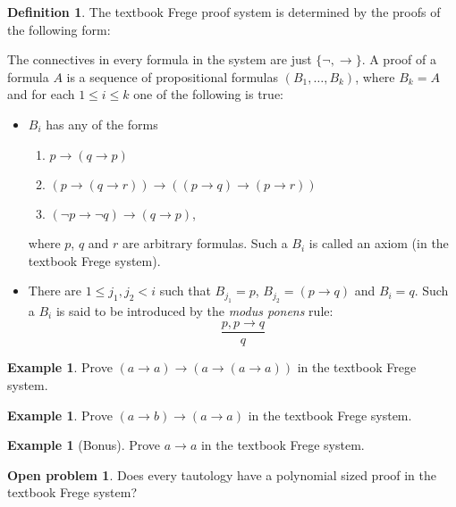 \documentclass{article}
\theoremstyle{definition}
\newtheorem{exmp}[thrm]{Example}
\newtheorem{prbl}[thrm]{Open problem}
\newtheorem{defi}[thrm]{Definition}
\begin{document}
\begin{defi}
    The textbook Frege proof system is determined by the proofs of the following form:

    The connectives in every formula in the system are just $\{\lnot, \to \}$. A proof of a formula $A$ is a sequence of propositional formulas $(B_1,\dots, B_k)$, where $B_k=A$ and for each $1 \leq i \leq k$ one of the following is true:
    \begin{itemize}
        \item $B_i$ has any of the forms
        \begin{enumerate}
            \item $p \to (q \to p)$
            \item $(p \to (q\to r))\to((p\to q)\to (p \to r))$
            \item $(\lnot p \to \lnot q)\to (q \to p)$,
        \end{enumerate}
        where $p$, $q$ and $r$ are arbitrary formulas. Such a $B_i$ is called an axiom (in the textbook Frege system).
        \item There are $1\leq j_1, j_2 < i$ such that $B_{j_1}=p$, $B_{j_2}=(p\to q)$ and $B_i=q$. Such a $B_i$ is said to be introduced by the \emph{modus ponens} rule: \[\frac{p, p\to q}{q}\]
    \end{itemize}

\end{defi}

\begin{exmp}
    Prove $(a \to a) \to (a \to (a \to a))$ in the textbook Frege system.
\end{exmp}

\begin{exmp}
    Prove $(a\to b) \to (a \to a)$ in the textbook Frege system.
\end{exmp}

\begin{exmp}[Bonus]
    Prove $a \to a$ in the textbook Frege system.
\end{exmp}

\begin{prbl}
    Does every tautology have a polynomial sized proof in the textbook Frege system?
\end{prbl}
\end{document}
